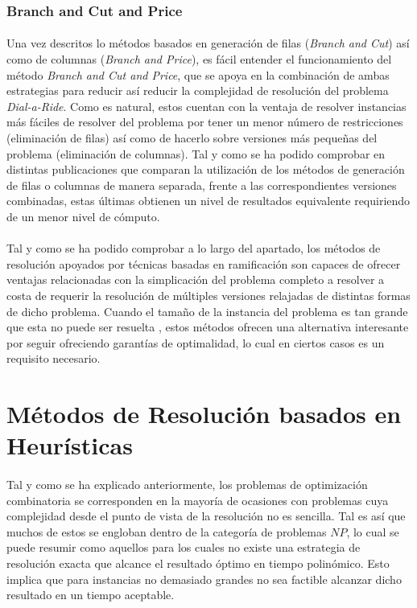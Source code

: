\documentclass{subfiles}
\begin{document}
        \subsubsection{Branch and Cut and Price}
        \label{sec:solving_branch_cut_price}

          \paragraph{}
          Una vez descritos lo métodos basados en generación de filas (\emph{Branch and Cut}) así como de columnas (\emph{Branch and Price}), es fácil entender el funcionamiento del método \emph{Branch and Cut and Price}, que se apoya en la combinación de ambas estrategias para reducir así reducir la complejidad de resolución del problema \emph{Dial-a-Ride}. Como es natural, estos cuentan con la ventaja de resolver instancias más fáciles de resolver del problema por tener un menor número de restricciones (eliminación de filas) así como de hacerlo sobre versiones más pequeñas del problema (eliminación de columnas). Tal y como se ha podido comprobar en distintas publicaciones que comparan la utilización de los métodos de generación de filas o columnas de manera separada, frente a las correspondientes versiones combinadas, estas últimas obtienen un nivel de resultados equivalente requiriendo de un menor nivel de cómputo.

      \paragraph{}
      Tal y como se ha podido comprobar a lo largo del apartado, los métodos de resolución apoyados por técnicas basadas en ramificación son capaces de ofrecer ventajas relacionadas con la simplicación del problema completo a resolver a costa de requerir la resolución de múltiples versiones relajadas de distintas formas de dicho problema. Cuando el tamaño de la instancia del problema es tan grande que esta no puede ser resuelta , estos métodos ofrecen una alternativa interesante por seguir ofreciendo garantías de optimalidad, lo cual en ciertos casos es un requisito necesario.

    \section{Métodos de Resolución basados en Heurísticas}
    \label{sec:solving_heuristics}

      \paragraph{}
      Tal y como se ha explicado anteriormente, los problemas de optimización combinatoria se corresponden en la mayoría de ocasiones con problemas cuya complejidad desde el punto de vista de la resolución no es sencilla. Tal es así que muchos de estos se engloban dentro de la categoría de problemas $NP$, lo cual se puede resumir como aquellos para los cuales no existe una estrategia de resolución exacta que alcance el resultado óptimo en tiempo polinómico. Esto implica que para instancias no demasiado grandes no sea factible alcanzar dicho resultado en un tiempo aceptable.
\end{document}
